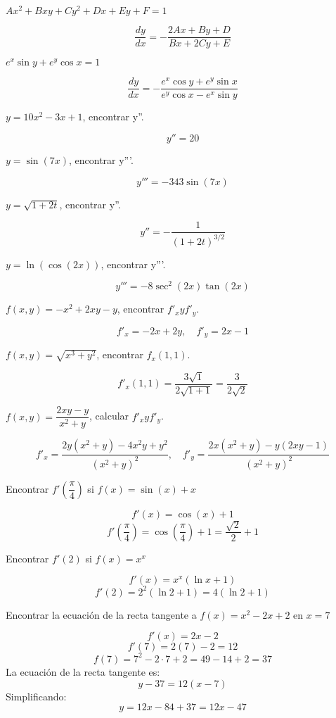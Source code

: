 \documentclass[answers]{exam} %
\begin{document}
\begin{questions}
    \question $Ax^2 + Bxy + Cy^2 + Dx + Ey + F = 1$
    
    \[
    \frac{dy}{dx} = -\frac{2Ax + By + D}{Bx + 2Cy + E}
    \]

    \question $e^x \sin y + e^y \cos x = 1$
    
    \[
    \frac{dy}{dx} = -\frac{e^x \cos y + e^y \sin x}{e^y \cos x - e^x \sin y}
    \]

    \question $y=10x^2-3x+1$, encontrar y''.
    
    \[
    y'' = 20
    \]

    \question $y=\sin(7x)$, encontrar y'''.
    
    \[
    y''' = -343\sin(7x)
    \]

    \question $y=\sqrt{1+2t}$, encontrar y''.
    
    \[
    y'' = -\frac{1}{(1+2t)^{3/2}}
    \]

    \question $y=\ln(\cos(2x))$, encontrar y'''.
    
    \[
    y''' = -8\sec^2(2x)\tan(2x)
    \]

    \question $f(x,y)=-x^2+2xy-y$, encontrar $f'_x y f'_y$.
    
    \[
    f'_x = -2x + 2y, \quad f'_y = 2x - 1
    \]

    \question $f(x,y)=\sqrt{x^3+y^2}$, encontrar $f_x(1,1)$.
    
    \[
    f'_x(1,1) = \frac{3\sqrt{1}}{2\sqrt{1+1}} = \frac{3}{2\sqrt{2}}
    \]

    \question $f(x,y)=\dfrac{2xy-y}{x^2+y}$, calcular $f'_x y f'_y$.
    
    \[
    f'_x = \frac{2y(x^2+y) - 4x^2y + y^2}{(x^2 + y)^2}, \quad f'_y = \frac{2x(x^2 + y) - y(2xy - 1)}{(x^2 + y)^2}
    \]

    \question Encontrar $f'(\dfrac{\pi}{4})$ si $f(x)=\sin(x)+x$
   
    \[
    f'(x) = \cos(x) + 1
    \]
    \[
    f'\left(\frac{\pi}{4}\right) = \cos\left(\frac{\pi}{4}\right) + 1 = \frac{\sqrt{2}}{2} + 1
    \]

    \question Encontrar $f'(2)$ si $f(x)=x^x$
   
    \[
    f'(x) = x^x (\ln x + 1)
    \]
    \[
    f'(2) = 2^2 (\ln 2 + 1) = 4 (\ln 2 + 1)
    \]

    \question Encontrar la ecuación de la recta tangente a $f(x)=x^2-2x+2$ en $x=7$
   
    \[
    f'(x) = 2x - 2
    \]
    \[
    f'(7) = 2(7) - 2 = 12
    \]
    \[
    f(7) = 7^2 - 2 \cdot 7 + 2 = 49 - 14 + 2 = 37
    \]
    La ecuación de la recta tangente es:
    \[
    y - 37 = 12(x - 7)
    \]
    Simplificando:
    \[
    y = 12x - 84 + 37 = 12x - 47
    \]
    

\end{questions}
\end{document}

